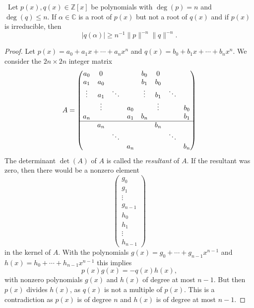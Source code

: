 \begin{lemma}\label{lem:10}\
  Let $p(x), q(x) ∈ℤ[x]$ be polynomials with $\deg(p) = n$ and $\deg(q) ≤ n$. If $α∈ℂ$ is a root of $p(x)$ but not a root of $q(x)$  and if $p(x)$ is irreducible, then
  \begin{displaymath}
    | q(α)| ≥ n^{-1} \|p\|^{-n} \|q\|^{-n}. 
  \end{displaymath}
\end{lemma}

\begin{proof}
  Let $p(x) = a_0 + a_1 x + \cdots + a_n x^n$ and $q(x) = b_0+b_1x+ \cdots+ b_nx^n$. We consider the $2n × 2n$ integer matrix
  \begin{displaymath}
    A = 
    \begin{pmatrix}
      a_0  &   0   &     &    &  b_0  &   0   &     &\\
      a_1  &   a_0 &     &    & b_1  &   b_0 &     &  \\
      \vdots &  a_1&  \ddots &  & \vdots &  b_1&  \ddots &   \\
              & \vdots&       & a_0 &  & \vdots&       & b_0 \\
              a_n    &       &       & a_1  &b_n    &       &       & b_1  \\
              \hline
               &   a_n  & &    &  &   b_n  & & \\
               &       & \ddots & &  &       & \ddots &\\
               &       &        & a_n & &       &        & b_n 
    \end{pmatrix}
  \end{displaymath}
  The determinant $\det(A)$ of $A$ is called the \emph{resultant} of $A$. If the resultant was zero, then there would be a nonzero element
  \begin{displaymath}
    \begin{pmatrix}
      g_0\\
      g_1\\
      \vdots\\
      g_{n-1} \\
       h_0\\
      h_1\\
      \vdots\\
      h_{n-1} 
    \end{pmatrix}
  \end{displaymath}
  in the kernel of $A$. With the polynomials $g(x) = g_0 + \cdots + g_{n-1}x^{n-1}$ and $h(x) = h_0 + \cdots + h_{n-1}x^{n-1}$ this implies
  \begin{displaymath}
    p(x) g(x) = - q(x) h(x),
  \end{displaymath}
  with nonzero polynomials $g(x)$ and $h(x)$ of degree at most $n-1$. But then $p(x)$ divides $h(x)$, as $q(x)$ is not a multiple of $p(x)$. This is a contradiction as $p(x)$ is of degree $n$ and $h(x)$ is of degree at most $n-1$.



\end{proof}
